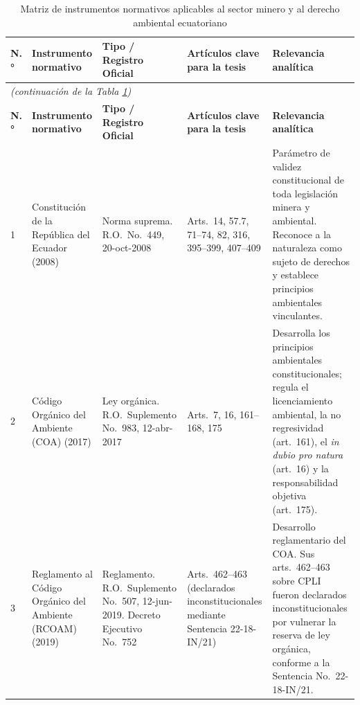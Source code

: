 
\begingroup
\small
\begin{longtable}{|p{}|p{}|p{}|p{}|p{}|}

\caption{Matriz de instrumentos normativos aplicables al sector minero y al derecho ambiental ecuatoriano}
\label{tab:normativa} \\

\hline
\textbf{N.°} & \textbf{Instrumento normativo} & \textbf{Tipo / Registro Oficial} & \textbf{Artículos clave para la tesis} & \textbf{Relevancia analítica} \\
\hline
\endfirsthead

\multicolumn{5}{l}{\small\textit{(continuación de la Tabla \ref*{tab:normativa})}} \\[2pt]
\hline
\textbf{N.°} & \textbf{Instrumento normativo} & \textbf{Tipo / Registro Oficial} & \textbf{Artículos clave para la tesis} & \textbf{Relevancia analítica} \\
\hline
\endhead

\hline
\endfoot

1 &
Constitución de la República del Ecuador (2008) &
Norma suprema. R.O.\ No.\ 449, 20-oct-2008 &
Arts.\ 14, 57.7, 71--74, 82, 316, 395--399, 407--409 &
Parámetro de validez constitucional de toda legislación minera y ambiental. Reconoce a la naturaleza como sujeto de derechos y establece principios ambientales vinculantes. \\
\hline

2 &
Código Orgánico del Ambiente (COA) (2017) &
Ley orgánica. R.O.\ Suplemento No.\ 983, 12-abr-2017 &
Arts.\ 7, 16, 161--168, 175 &
Desarrolla los principios ambientales constitucionales; regula el licenciamiento ambiental, la no regresividad (art.\ 161), el \textit{in dubio pro natura} (art.\ 16) y la responsabilidad objetiva (art.\ 175). \\
\hline

3 &
Reglamento al Código Orgánico del Ambiente (RCOAM) (2019) &
Reglamento. R.O.\ Suplemento No.\ 507, 12-jun-2019. Decreto Ejecutivo No.\ 752 &
Arts.\ 462--463 (declarados inconstitucionales mediante Sentencia 22-18-IN/21) &
Desarrollo reglamentario del COA. Sus arts.\ 462--463 sobre CPLI fueron declarados inconstitucionales por vulnerar la reserva de ley orgánica, conforme a la Sentencia No.\ 22-18-IN/21. \\
\hline


\end{longtable}
